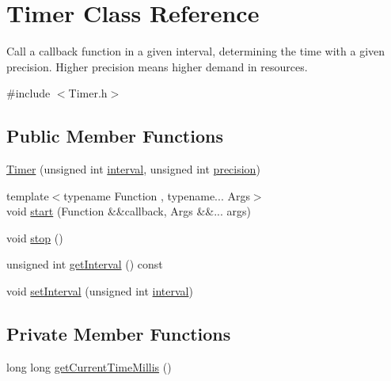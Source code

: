 \hypertarget{class_timer}{}\section{Timer Class Reference}
\label{class_timer}


Call a callback function in a given interval, determining the time with a given precision. Higher precision means higher demand in resources.  




{\ttfamily \#include $<$Timer.\+h$>$}

\subsection*{Public Member Functions}
\begin{DoxyCompactItemize}
\item 
\hyperlink{class_timer_a5b659c4fb572c549dad183a7b32b08df}{Timer} (unsigned int \hyperlink{class_timer_aaf9bce1286b714658a0f4484d8fee960}{interval}, unsigned int \hyperlink{class_timer_a3d1026dd88596a97cb6b768f475ed57f}{precision})
\item 
{\footnotesize template$<$typename Function , typename... Args$>$ }\\void \hyperlink{class_timer_adcf70b5065e31461e27309c96065437a}{start} (Function \&\&callback, Args \&\&... args)
\item 
void \hyperlink{class_timer_a63f0eb44b27402196590a03781515dba}{stop} ()
\item 
unsigned int \hyperlink{class_timer_a6cbb88b5073d95fd871a012966005618}{get\+Interval} () const
\item 
void \hyperlink{class_timer_a0b24293bfc154f7432b1c52ac857d853}{set\+Interval} (unsigned int \hyperlink{class_timer_aaf9bce1286b714658a0f4484d8fee960}{interval})
\end{DoxyCompactItemize}
\subsection*{Private Member Functions}
\begin{DoxyCompactItemize}
\item 
long long \hyperlink{class_timer_a39a332f8ce3a45ed8d78c772755342c8}{get\+Current\+Time\+Millis} ()
\end{DoxyCompactItemize}
